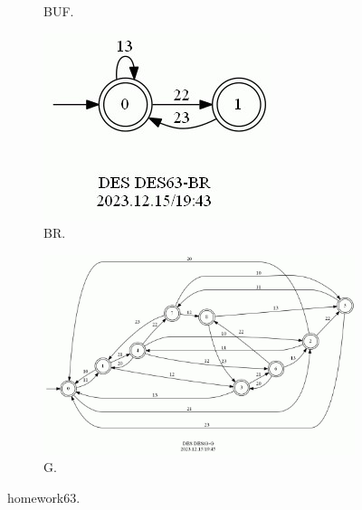 \documentclass{article}
\begin{document}
\begin{figure}[h!]
\begin{subfigure}{0.26\linewidth}
    \caption{BUF.}
  \end{subfigure}
  \begin{subfigure}{0.2\linewidth}
    \includegraphics[width=\linewidth]{assets/DES63-BR.jpg}
    \caption{BR.}
  \end{subfigure}
  \begin{subfigure}{\linewidth}
    \includegraphics[width=\linewidth]{assets/DES63-G.jpg}
    \caption{G.}
  \end{subfigure}
  \caption{homework63.}
  \label{fig:des63}
\end{figure}
\end{document}
